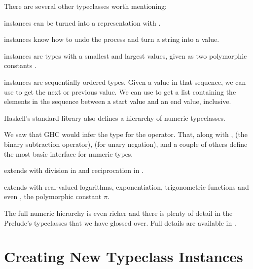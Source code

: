 There are several other typeclasses worth mentioning:

\begin{notelist}
    \item {} instances can be turned into a  representation with .
    \item {} instances know how to undo the process and turn a string into a value.
    \item {} instances are types with a smallest and largest values, given as two polymorphic 
          constants .
    \item {} instances are sequentially ordered types. Given a value in that sequence, we can use
           to get the next or previous value. We can use 
           to get a list containing the elements in the sequence
          between a start value and an end value, inclusive.
\end{notelist}

Haskell's standard library also defines a hierarchy of numeric typeclasses.

\begin{notelist}
    \item We saw that GHC would infer the type  for the \code{(+)} operator.
          That, along with \code{(*)}, \code{(-)} (the binary subtraction operator),  (for unary
          negation), and a couple of others define the most basic interface for numeric types.
    \item {} extends  with division in \code{(/)} and reciprocation in .
    \item {} extends  with real-valued logarithms, exponentiation, trigonometric
          functions and even , the polymorphic constant $\pi$.
\end{notelist}

The full numeric hierarchy is even richer and there is plenty of detail in the Prelude's typeclasses that we
have glossed over. Full details are available in \cite[section 6.4]{haskell98}.

\section{Creating New Typeclass Instances}

